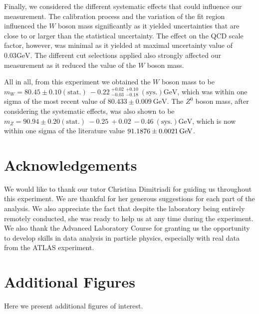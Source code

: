 \documentclass[a4paper]{report}
\numberwithin{equation}{section}
\begin{document}
Finally, we considered the different systematic effects that could influence our measurement. The calibration process and the 
variation of the fit region influenced the $W$ boson mass significantly as it yielded uncertainties that are close to or larger 
than the statistical uncertainty. The effect on the QCD scale factor, however, was minimal as it yielded at maximal 
uncertainty value of $0.03 \si{\giga\electronvolt}$. The different cut selections applied also strongly affected our measurement 
as it reduced the value of the $W$ boson mass. \par 

All in all, from this experiment we obtained the $W$ boson mass to be $m_W = 80.45 \pm 0.10 (\mathrm{stat.}) \: -0.22 \: 
^{+0.02}_{-0.03} \: ^{+0.10}_{-0.18} \: (\mathrm{sys.}) \si{\giga\electronvolt}$, which was within one sigma of the most recent 
value of  $80.433 \pm 0.009 \ \text{GeV}$. The $Z^0$ boson mass, after considering the systematic effects, was also shown to be $m_Z = 90.94 \pm 0.20 (\mathrm{stat.}) \: 
-0.25 \: + 0.02 \: -0.46 \: (\mathrm{sys.}) \si{\giga\electronvolt}$, which is now within one sigma of the literature value 
$\SI{91.1876 \pm 0.0021}{\giga\electronvolt}$. 

\chapter{Acknowledgements}

We would like to thank our tutor Christina Dimitriadi for guiding us throughout this experiment. We are thankful for her generous suggestions for each part of the analysis. We also appreciate the fact that despite the laboratory being entirely remotely conducted, she was ready to help us at any time during the experiment. We also thank the Advanced Laboratory Course for granting us the opportunity to develop skills in data analysis in particle physics, especially with real data from the ATLAS experiment. 


\printbibliography

\appendix

\chapter{Additional Figures} \label{chap:appendix_figs}

Here we present additional figures of interest.
\end{document}
